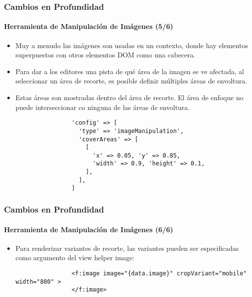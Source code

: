 \begin{frame}[fragile]
	\frametitle{Cambios en Profundidad}
	\framesubtitle{Herramienta de Manipulación de Imágenes (5/6)}

	\lstset{basicstyle=\tiny\ttfamily}

	\begin{itemize}
		\item Muy a menudo las imágenes son usadas en un contexto, donde hay elementos superpuestos con otros elementos DOM como una cabecera.
		\item Para dar a los editores una pista de qué área de la imagen se ve afectada, al seleccionar un área de recorte,
			es posible definir múltiples áreas de envoltura.
		\item Estas áreas son mostradas dentro del área de recorte. El área de enfoque no puede interseccionar co ninguna de las áreas de envoltura.

			\begin{lstlisting}
				'config' => [
				  'type' => 'imageManipulation',
				  'coverAreas' => [
				    [
				      'x' => 0.05, 'y' => 0.85,
				      'width' => 0.9, 'height' => 0.1,
				    ],
				  ],
				]
			\end{lstlisting}

	\end{itemize}

\end{frame}


\begin{frame}[fragile]
	\frametitle{Cambios en Profundidad}
	\framesubtitle{Herramienta de Manipulación de Imágenes (6/6)}

	\lstset{basicstyle=\smaller\ttfamily}

	\begin{itemize}
		\item Para renderizar variantes de recorte, las variantes pueden ser especificadas como argumento del view helper image:

			\begin{lstlisting}
				<f:image image="{data.image}" cropVariant="mobile" width="800" >
				</f:image>
			\end{lstlisting}

	\end{itemize}

\end{frame}

